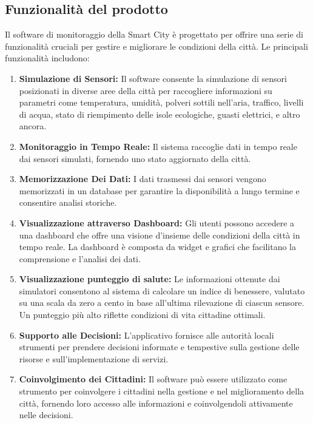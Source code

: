 \subsection{Funzionalità del prodotto}

Il software di monitoraggio della Smart City è progettato per offrire una serie di funzionalità cruciali per gestire e migliorare le condizioni della città. Le principali funzionalità includono:

\begin{enumerate}
    \item \textbf{Simulazione di Sensori:} Il software consente la simulazione di sensori posizionati in diverse aree della città per raccogliere informazioni su parametri come temperatura, umidità, polveri sottili nell’aria, traffico, livelli di acqua, stato di riempimento delle isole ecologiche, guasti elettrici, e altro ancora.

    \item \textbf{Monitoraggio in Tempo Reale:} Il sistema raccoglie dati in tempo reale dai sensori simulati, fornendo uno stato aggiornato della città.

    \item \textbf{Memorizzazione Dei Dati:} I dati trasmessi dai sensori vengono memorizzati in un database per garantire la disponibilità a lungo termine e consentire analisi storiche.

    \item \textbf{Visualizzazione attraverso Dashboard:} Gli utenti possono accedere a una dashboard che offre una visione d’insieme delle condizioni della città in tempo reale. La dashboard è composta da widget e grafici che facilitano la comprensione e l'analisi dei dati.

    \item \textbf{Visualizzazione punteggio di salute:} Le informazioni ottenute dai simulatori consentono al sistema di calcolare un indice di benessere, valutato su una scala da zero a cento in base all'ultima rilevazione di ciascun sensore. Un punteggio più alto riflette condizioni di vita cittadine ottimali.

    \item \textbf{Supporto alle Decisioni:} L'applicativo fornisce alle autorità locali strumenti per prendere decisioni informate e tempestive sulla gestione delle risorse e sull'implementazione di servizi.

    \item \textbf{Coinvolgimento dei Cittadini:} Il software può essere utilizzato come strumento per coinvolgere i cittadini nella gestione e nel miglioramento della città, fornendo loro accesso alle informazioni e coinvolgendoli attivamente nelle decisioni.

\end{enumerate}